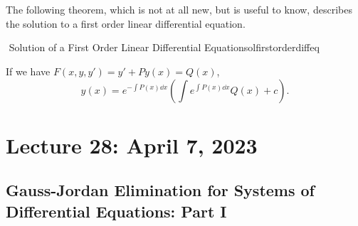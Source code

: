     \vphantom
    \\
    \\
    The following theorem, which is not at all new, but is useful to know, describes the solution to a first order linear differential equation.
    \begin{theorem}{\Stop\,\,Solution of a First Order Linear Differential Equation}{solfirstorderdiffeq}

        If we have \(F(x,y,y')=y'+Py(x)=Q(x)\),
        \begin{equation*}
            y(x)=e^{-\int P(x)\dd x}\left(\int e^{\int P(x)\dd x}Q(x)+c\right).
        \end{equation*}

    \end{theorem}

\pagebreak

\section{Lecture 28: April 7, 2023}

    \subsection{Gauss-Jordan Elimination for Systems of Differential Equations: Part I}


